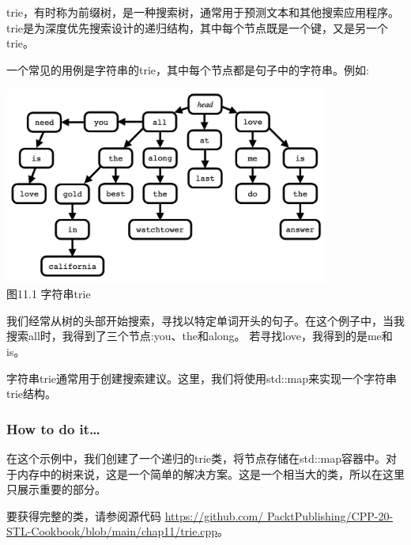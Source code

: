 
trie，有时称为前缀树，是一种搜索树，通常用于预测文本和其他搜索应用程序。trie是为深度优先搜索设计的递归结构，其中每个节点既是一个键，又是另一个trie。

一个常见的用例是字符串的trie，其中每个节点都是句子中的字符串。例如:

\begin{center}
\includegraphics[width=0.8\textwidth]{content/chapter11/images/1.png}\\
图11.1 字符串trie
\end{center}

我们经常从树的头部开始搜索，寻找以特定单词开头的句子。在这个例子中，当我搜索all时，我得到了三个节点:you、the和along。
若寻找love，我得到的是me和is。

字符串trie通常用于创建搜索建议。这里，我们将使用std::map来实现一个字符串trie结构。

\subsubsection{How to do it…}

在这个示例中，我们创建了一个递归的trie类，将节点存储在std::map容器中。对于内存中的树来说，这是一个简单的解决方案。这是一个相当大的类，所以在这里只展示重要的部分。

要获得完整的类，请参阅源代码 \url{https://github.com/ PacktPublishing/CPP-20-STL-Cookbook/blob/main/chap11/trie.cpp}。


